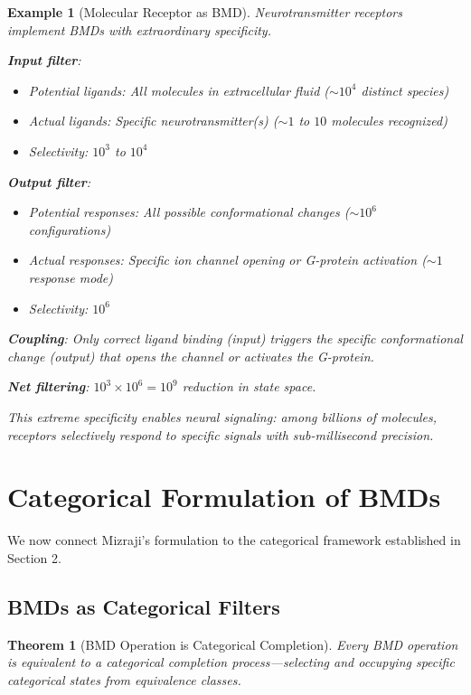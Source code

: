 \documentclass[12pt,a4paper]{article}
\newtheorem{theorem}{Theorem}
\newtheorem{example}{Example}
\begin{document}
\begin{example}[Molecular Receptor as BMD]
\label{ex:receptor_bmd}
Neurotransmitter receptors implement BMDs with extraordinary specificity.

\textbf{Input filter}:
\begin{itemize}
\item Potential ligands: All molecules in extracellular fluid ($\sim 10^4$ distinct species)
\item Actual ligands: Specific neurotransmitter(s) ($\sim 1$ to $10$ molecules recognized)
\item Selectivity: $10^3$ to $10^4$
\end{itemize}

\textbf{Output filter}:
\begin{itemize}
\item Potential responses: All possible conformational changes ($\sim 10^{6}$ configurations)
\item Actual responses: Specific ion channel opening or G-protein activation ($\sim 1$ response mode)
\item Selectivity: $10^6$
\end{itemize}

\textbf{Coupling}: Only correct ligand binding (input) triggers the specific conformational change (output) that opens the channel or activates the G-protein.

\textbf{Net filtering}: $10^3 \times 10^6 = 10^9$ reduction in state space.

This extreme specificity enables neural signaling: among billions of molecules, receptors selectively respond to specific signals with sub-millisecond precision.
\end{example}

\section{Categorical Formulation of BMDs}

We now connect Mizraji's formulation to the categorical framework established in Section 2.

\subsection{BMDs as Categorical Filters}

\begin{theorem}[BMD Operation is Categorical Completion]
\label{thm:bmd_categorical}
Every BMD operation is equivalent to a categorical completion process—selecting and occupying specific categorical states from equivalence classes.
\end{theorem}
\end{document}
